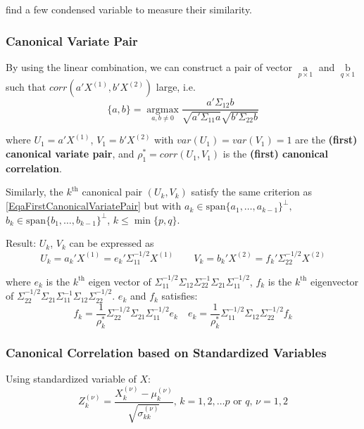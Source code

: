     find a few condensed variable to measure their similarity.
    
    
\subsubsection{Canonical Variate Pair}
    By using the linear combination, we can construct a pair of vector $ \mathop{a}\limits_{p\times 1 }  $ and $ \mathop{b}\limits_{q\times 1}  $ such that $ corr(a'X^{(1)},b'X^{(2)}) $ large, i.e.
    \begin{equation}\label{EqaFirstCanonicalVariatePair}
        \{a,b\}=\mathop{\arg\max}\limits_{a,b\neq 0}\dfrac{a'\Sigma _{12}b}{\sqrt{a'\Sigma _{11}a}\sqrt{b'\Sigma _{22}b}}  
    \end{equation}

    
    
    where $ U_1=a'X^{(1)} $, $ V_1=b'X^{(2)} $ with $ var(U_1)=var(V_1)=1 $ are the \textbf{(first) canonical variate pair}, and $ \rho^* _1=corr(U_1,V_1) $ is the \textbf{(first) canonical correlation}.
    
    Similarly, the $ k^{\mathrm{th}} $ canonical pair $ (U_k,V_k) $ satisfy the same criterion as \autoref{EqaFirstCanonicalVariatePair} but with $ a_k\in \mathrm{span}\{a_1,\ldots,a_{k-1}\}^\perp,$ $b_k\in\mathrm{span}\{b_1,\ldots,b_{k-1}\}^\perp $, $ k\leq \min\{p,q\} $.
    
    Result: $ U_k $, $ V_k $ can be expressed as 
    \begin{equation}
        U_k=a_k'X^{(1)}=e_k'\Sigma _{11}^{-1/2}X^{(1)}\qquad V_k=b_k'X^{(2)}=f_k'\Sigma _{22}^{-1/2}X^{(2)} 
    \end{equation}
    
    where $ e_k $ is the $ k^\mathrm{th} $ eigen vector of $ \Sigma _{11}^{-1/2}\Sigma _{12}\Sigma _{22}^{-1}\Sigma _{21}\Sigma _{11}^{-1/2} $, $ f_k $ is the $ k^\mathrm{th} $ eigenvector of $ \Sigma _{22}^{-1/2}\Sigma _{21}\Sigma _{11}^{-1}\Sigma _{12}\Sigma _{22}^{-1/2} $. $ e_k $ and $ f_k $ satisfies:
    \begin{equation}
        f_k=\dfrac{1}{\rho ^*_k}\Sigma _{22}^{-1/2}\Sigma _{21}\Sigma _{11}^{-1/2}e_k\quad e_k=\dfrac{1}{\rho _k^*}\Sigma _{11}^{-1/2}\Sigma _{12}\Sigma _{22}^{-1/2}f_k
    \end{equation}
       
    
\subsubsection{Canonical Correlation based on Standardized Variables}
    Using standardized variable of $ X $:
    \begin{equation}
        Z_k^{(\nu )}=\dfrac{X_k^{(\nu )}-\mu _k^{(\nu )}}{\sqrt{\sigma _{kk}^{(\nu )}}},\,k=1,2,\ldots p\text{ or }q,\, \nu =1,2
    \end{equation}
    
